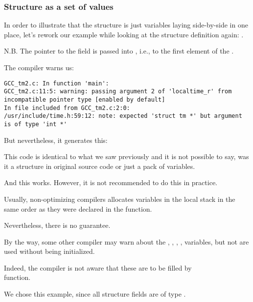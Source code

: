 ﻿\subsubsection{Structure as a set of values}

In order to illustrate that the structure is just variables laying side-by-side in one place, 
let's rework our example while looking at the  structure definition again: .



N.B. 
The pointer to the  field is passed into , i.e., 
to the first element of the .

The compiler warns us:

\begin{lstlisting}[caption=GCC 4.7.3]
GCC_tm2.c: In function 'main':
GCC_tm2.c:11:5: warning: passing argument 2 of 'localtime_r' from incompatible pointer type [enabled by default]
In file included from GCC_tm2.c:2:0:
/usr/include/time.h:59:12: note: expected 'struct tm *' but argument is of type 'int *'
\end{lstlisting}

But nevertheless, it generates this:



This code is identical to what we saw previously and it is
not possible to say, was it a structure in original source code or just a pack of variables.

And this works. 
However, it is not recommended to do this in practice. 

Usually, non-optimizing compilers allocates variables in the local stack in the 
same order as they were declared in the function.

Nevertheless, there is no guarantee.

By the way, some other compiler may warn about the , , ,
,  variables, but not 
 are used without being initialized.

Indeed, the compiler is not aware that these are to be filled by\\
 function.

We chose this example, since all structure fields are of type \Tint.%

